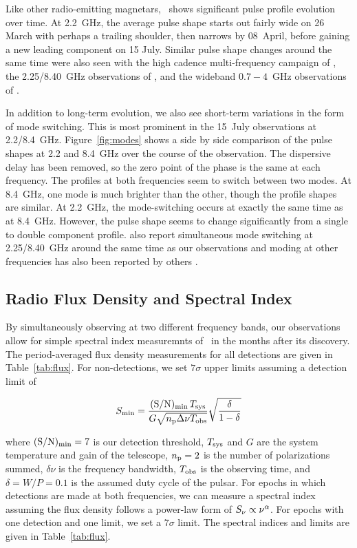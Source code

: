 \documentclass[twocolumn]{emulateapj}
\begin{document}
Like other radio-emitting magnetars, \jmag\ shows significant pulse 
profile evolution over time.  At 2.2~GHz, the average pulse shape 
starts out fairly wide on 26 March with perhaps a trailing shoulder, 
then narrows by 08~April, before gaining a new leading component 
on 15 July.  Similar pulse shape changes around the same time were 
also seen with the high cadence multi-frequency campaign of 
\citet{champion2020}, the 2.25/8.40~GHz observations of 
\citet{huang2021}, and the wideband $0.7-4$~GHz observations of 
\citet{lower2021}.   

In addition to long-term evolution, we also see short-term variations 
in the form of mode switching.  This is most prominent in the 15~July 
observations at 2.2/8.4~GHz.  Figure~\ref{fig:modes} shows a side by side 
comparison of the pulse shapes at 2.2 and 8.4~GHz over the course of the 
observation.  The dispersive delay has been removed, so the zero point 
of the phase is the same at each frequency.  The profiles at both 
frequencies seem to switch between two modes.  At 8.4~GHz, one mode 
is much brighter than the other, though the profile shapes are similar. 
At 2.2~GHz, the mode-switching occurs at exactly the same time as at 
8.4~GHz.  However, the pulse shape seems to change significantly from 
a single to double component profile.  \citet{huang2021} also report 
simultaneous mode switching at 2.25/8.40~GHz around the same time 
as our observations and moding at other frequencies has also been 
reported by others \citep{lower2021, rajwade2022}. 


\subsection{Radio Flux Density and Spectral Index}
\label{ssec:spec}
By simultaneously observing at two different frequency bands, 
our observations allow for simple spectral index measuremnts 
of \jmag\ in the months after its discovery.  
The period-averaged flux density measurements for all detections 
are given in Table~\ref{tab:flux}.  For non-detections, we set 
$7\sigma$ upper limits assuming a detection limit of 

\begin{equation}
  S_{\rm min} = \frac{({\rm S/N})_{\rm min} \, T_{\rm sys}}
                       {G \sqrt{n_{\rm p} \Delta \nu T_{\rm obs}}} 
                \sqrt{\frac{\delta}{1-\delta}}
\label{eqn:snr}
\end{equation} 

where $\rm (S/N)_{\rm min} = 7$ is our detection threshold, 
$T_{\rm sys}$ and $G$ are the system temperature and gain of 
the telescope, $n_{\rm p} = 2$ is the number of polarizations 
summed, $\delta \nu$ is the frequency bandwidth, $T_{\rm obs}$ 
is the observing time, and $\delta = W/P = 0.1$ is the assumed 
duty cycle of the pulsar.  For epochs in which detections are 
made at both frequencies, we can measure a spectral index 
assuming the flux density follows a power-law form 
of $S_{\rm \nu} \propto \nu^\alpha$.  For epochs with one 
detection and one limit, we set a $7\sigma$ limit.  The 
spectral indices and limits are given in Table~\ref{tab:flux}.
\end{document}
